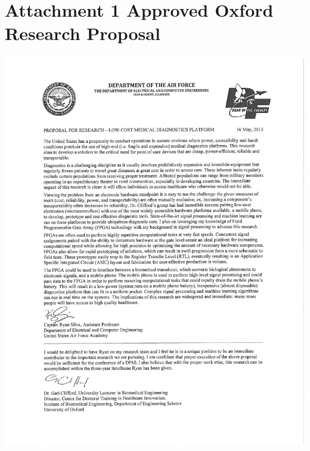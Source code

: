 \documentclass{article}
\begin{document}
\section*{Attachment 1 \newline Approved Oxford Research Proposal}
\label{sec:prop}
\centering
\vspace{-5mm}
\includegraphics[scale=.85,clip=true,trim=1in .5in 1cm 0.4in]{MFR_ProposalforResearch_SilvaSIGNED.pdf}

\newpage
\end{document}
